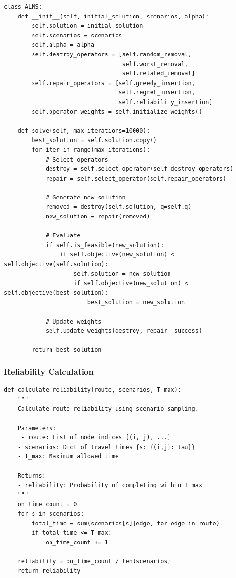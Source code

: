 \begin{verbatim}
class ALNS:
    def __init__(self, initial_solution, scenarios, alpha):
        self.solution = initial_solution
        self.scenarios = scenarios
        self.alpha = alpha
        self.destroy_operators = [self.random_removal,
                                  self.worst_removal,
                                  self.related_removal]
        self.repair_operators = [self.greedy_insertion,
                                 self.regret_insertion,
                                 self.reliability_insertion]
        self.operator_weights = self.initialize_weights()

    def solve(self, max_iterations=10000):
        best_solution = self.solution.copy()
        for iter in range(max_iterations):
            # Select operators
            destroy = self.select_operator(self.destroy_operators)
            repair = self.select_operator(self.repair_operators)

            # Generate new solution
            removed = destroy(self.solution, q=self.q)
            new_solution = repair(removed)

            # Evaluate
            if self.is_feasible(new_solution):
                if self.objective(new_solution) < self.objective(self.solution):
                    self.solution = new_solution
                    if self.objective(new_solution) < self.objective(best_solution):
                        best_solution = new_solution

            # Update weights
            self.update_weights(destroy, repair, success)

        return best_solution
\end{verbatim}

\subsubsection{Reliability Calculation}

\begin{verbatim}
def calculate_reliability(route, scenarios, T_max):
    """
    Calculate route reliability using scenario sampling.

    Parameters:
     - route: List of node indices [(i, j), ...]
    - scenarios: Dict of travel times {s: {(i,j): tau}}
    - T_max: Maximum allowed time

    Returns:
    - reliability: Probability of completing within T_max
    """
    on_time_count = 0
    for s in scenarios:
        total_time = sum(scenarios[s][edge] for edge in route)
        if total_time <= T_max:
            on_time_count += 1

    reliability = on_time_count / len(scenarios)
    return reliability
\end{verbatim}

